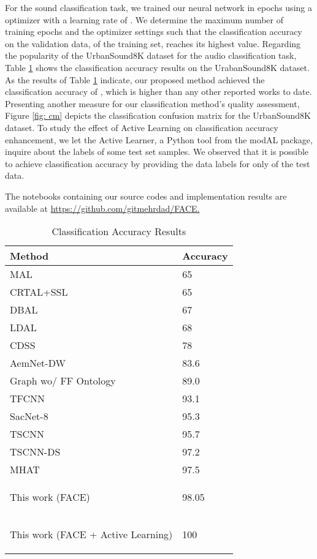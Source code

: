 \documentclass{article}
\begin{document}
For the sound classification task, we trained our neural network in  epochs using a  optimizer with a learning rate of . We determine the maximum number of training epochs and the optimizer settings such that the classification accuracy on the validation data,  of the training set, reaches its highest value. Regarding the popularity of the UrbanSound8K dataset for the audio classification task, Table \ref{tab: class} shows the classification accuracy results on the UrabanSound8K dataset. As the results of Table \ref{tab: class} indicate, our proposed method achieved the classification accuracy of , which is higher than any other reported works to date. Presenting another measure for our classification method's quality assessment, Figure \ref{fig: cm} depicts the classification confusion matrix for the UrbanSound8K dataset. To study the effect of Active Learning on classification accuracy enhancement, we let the Active Learner, a Python tool from the modAL package, inquire about the labels of some test set samples. We observed that it is possible to achieve  classification accuracy by providing the data labels for only  of the test data.

The notebooks containing our source codes and implementation results are available at \href{https://github.com/gitmehrdad/FACE}{https://github.com/gitmehrdad/FACE.}

\begin{table}
	\caption{Classification Accuracy Results}
	\centering
	\label{tab: class}
	\begin{tabular}{ll}
		\toprule
		Method      & Accuracy	\\
		\midrule
		MAL\citep{Shuyang}				& 65	\\
		CRTAL+SSL\citep{Dilek, Malte}	& 65	\\	
		DBAL\citep{Ji}					& 67	\\
		LDAL\citep{Qin}					& 68	\\
		CDSS\citep{Lee}					& 78	\\
		AemNet-DW\citep{Lopez}			& 83.6	\\
		Graph wo/ FF Ontology\citep{Sun}& 89.0	\\
		TFCNN\citep{Mu}					& 93.1	\\
		SacNet-8\citep{Li}				& 95.3	\\
		TSCNN\citep{Dong}				& 95.7	\\
		TSCNN-DS\citep{Su}				& 97.2	\\
		MHAT\citep{Song}				& 97.5	\\
		\begin{bfseries}This work (FACE) \end{bfseries} 	& \begin{bfseries}98.05 \end{bfseries} 		\\
		\begin{bfseries}This work (FACE + Active Learning) \end{bfseries} 	& \begin{bfseries}100 \end{bfseries} 		\\
		\bottomrule
	\end{tabular}
\end{table}
\end{document}
